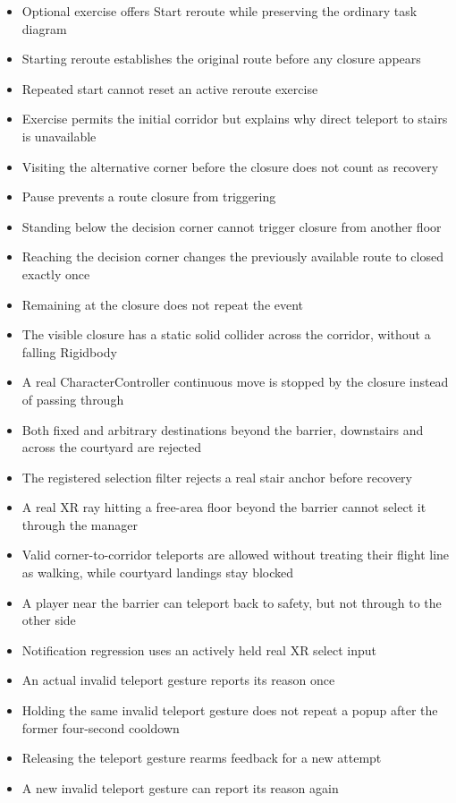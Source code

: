 \documentclass[12pt,a4paper]{article}
\begin{document}
\begin{itemize}[leftmargin=*,nosep]
\item Optional exercise offers Start reroute while preserving the ordinary task diagram
\item Starting reroute establishes the original route before any closure appears
\item Repeated start cannot reset an active reroute exercise
\item Exercise permits the initial corridor but explains why direct teleport to stairs is unavailable
\item Visiting the alternative corner before the closure does not count as recovery
\item Pause prevents a route closure from triggering
\item Standing below the decision corner cannot trigger closure from another floor
\item Reaching the decision corner changes the previously available route to closed exactly once
\item Remaining at the closure does not repeat the event
\item The visible closure has a static solid collider across the corridor, without a falling Rigidbody
\item A real CharacterController continuous move is stopped by the closure instead of passing through
\item Both fixed and arbitrary destinations beyond the barrier, downstairs and across the courtyard are rejected
\item The registered selection filter rejects a real stair anchor before recovery
\item A real XR ray hitting a free-area floor beyond the barrier cannot select it through the manager
\item Valid corner-to-corridor teleports are allowed without treating their flight line as walking, while courtyard landings stay blocked
\item A player near the barrier can teleport back to safety, but not through to the other side
\item Notification regression uses an actively held real XR select input
\item An actual invalid teleport gesture reports its reason once
\item Holding the same invalid teleport gesture does not repeat a popup after the former four-second cooldown
\item Releasing the teleport gesture rearms feedback for a new attempt
\item A new invalid teleport gesture can report its reason again

\end{itemize}
\end{document}
